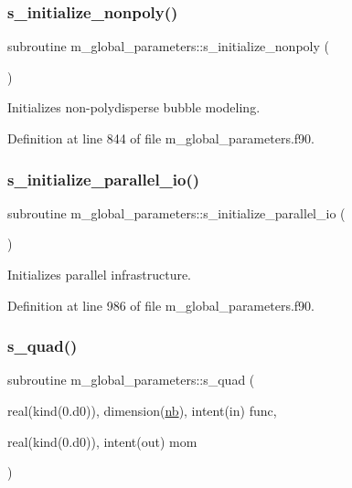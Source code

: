 \subsubsection{\texorpdfstring{s\+\_\+initialize\+\_\+nonpoly()}{s\_initialize\_nonpoly()}}
{\footnotesize\ttfamily subroutine m\+\_\+global\+\_\+parameters\+::s\+\_\+initialize\+\_\+nonpoly (\begin{DoxyParamCaption}{ }\end{DoxyParamCaption})}



Initializes non-\/polydisperse bubble modeling. 



Definition at line 844 of file m\+\_\+global\+\_\+parameters.\+f90.

\mbox{\label{namespacem__global__parameters_a54905a7a2ce9e15fc33ebac52c0d3c27}} 
\subsubsection{\texorpdfstring{s\+\_\+initialize\+\_\+parallel\+\_\+io()}{s\_initialize\_parallel\_io()}}
{\footnotesize\ttfamily subroutine m\+\_\+global\+\_\+parameters\+::s\+\_\+initialize\+\_\+parallel\+\_\+io (\begin{DoxyParamCaption}{ }\end{DoxyParamCaption})}



Initializes parallel infrastructure. 



Definition at line 986 of file m\+\_\+global\+\_\+parameters.\+f90.

\mbox{\label{namespacem__global__parameters_aa5a48fa9cc196136634022cfa6708213}} 
\subsubsection{\texorpdfstring{s\+\_\+quad()}{s\_quad()}}
{\footnotesize\ttfamily subroutine m\+\_\+global\+\_\+parameters\+::s\+\_\+quad (\begin{DoxyParamCaption}\item[{real(kind(0.d0)), dimension(\hyperlink{namespacem__global__parameters_ad76c4758994b52559f478d251dc0cba5}{nb}), intent(in)}]{func,  }\item[{real(kind(0.d0)), intent(out)}]{mom }\end{DoxyParamCaption})}



